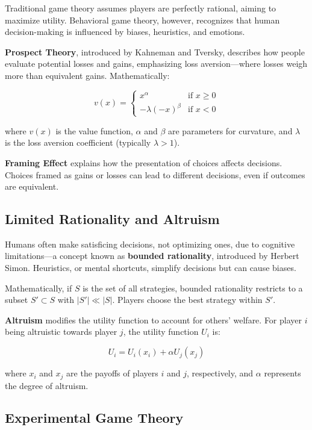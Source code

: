 \documentclass[12pt]{book} %
\begin{document}
Traditional game theory assumes players are perfectly rational, aiming to maximize utility. Behavioral game theory, however, recognizes that human decision-making is influenced by biases, heuristics, and emotions.

\textbf{Prospect Theory}, introduced by Kahneman and Tversky, describes how people evaluate potential losses and gains, emphasizing loss aversion—where losses weigh more than equivalent gains. Mathematically:

\[
v(x) = \begin{cases} 
x^\alpha & \text{if } x \geq 0 \\
-\lambda (-x)^\beta & \text{if } x < 0
\end{cases}
\]

where \( v(x) \) is the value function, \( \alpha \) and \( \beta \) are parameters for curvature, and \( \lambda \) is the loss aversion coefficient (typically \( \lambda > 1 \)).

\textbf{Framing Effect} explains how the presentation of choices affects decisions. Choices framed as gains or losses can lead to different decisions, even if outcomes are equivalent.

\subsection{Limited Rationality and Altruism}

Humans often make satisficing decisions, not optimizing ones, due to cognitive limitations—a concept known as \textbf{bounded rationality}, introduced by Herbert Simon. Heuristics, or mental shortcuts, simplify decisions but can cause biases.

Mathematically, if \( S \) is the set of all strategies, bounded rationality restricts to a subset \( S' \subset S \) with \( |S'| \ll |S| \). Players choose the best strategy within \( S' \).

\textbf{Altruism} modifies the utility function to account for others' welfare. For player \( i \) being altruistic towards player \( j \), the utility function \( U_i \) is:

\[
U_i = U_i(x_i) + \alpha U_j(x_j)
\]

where \( x_i \) and \( x_j \) are the payoffs of players \( i \) and \( j \), respectively, and \( \alpha \) represents the degree of altruism.

\subsection{Experimental Game Theory}
\end{document}
